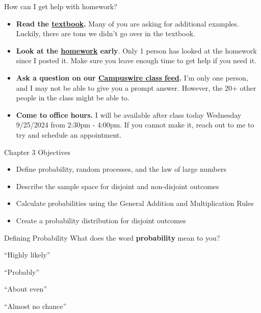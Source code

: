\documentclass[
  ignorenonframetext,
]{beamer}
\begin{document}
\begin{frame}{How can I get help with homework?}
\label{how-can-i-get-help-with-homework}
\begin{itemize}
\item
  \textbf{Read the
  \href{https://canvas.jcu.edu/files/3669904/download?download_frd=1}{textbook}.}
  Many of you are asking for additional examples. Luckily, there are
  tons we didn't go over in the textbook.
\item
  \textbf{Look at the
  \href{https://canvas.jcu.edu/courses/36290/assignments/451733}{homework}
  early}. Only 1 person has looked at the homework since I posted it.
  Make sure you leave enough time to get help if you need it.
\item
  \textbf{Ask a question on our
  \href{https://campuswire.com/c/G6427C531/feed}{Campuswire class
  feed}.} I'm only one person, and I may not be able to give you a
  prompt answer. However, the 20+ other people in the class might be
  able to.
\item
  \textbf{Come to office hours.} I will be available after class today
  Wednesday 9/25/2024 from 2:30pm - 4:00pm. If you cannot make it, reach
  out to me to try and schedule an appointment.
\end{itemize}
\end{frame}

\begin{frame}{Chapter 3 Objectives}
\label{chapter-3-objectives}
\begin{itemize}
\item
  Define probability, random processes, and the law of large numbers
\item
  Describe the sample space for disjoint and non-disjoint outcomes
\item
  Calculate probabilities using the General Addition and Multiplication
  Rules
\item
  Create a probability distribution for disjoint outcomes
\end{itemize}
\end{frame}

\begin{frame}{Defining Probability}
\label{defining-probability}
What does the word \textbf{probability} mean to you?

\pause

``Highly likely''

\pause

``Probably''

\pause

``About even''

\pause

``Almost no chance''
\end{frame}
\end{document}
